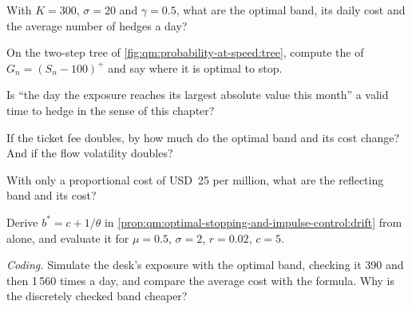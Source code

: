 \begin{exercise}[$\star$]\label{exo:qm:optimal-stopping-and-impulse-control:1}
With $K = 300$, $\sigma = 20$ and $\gamma = 0.5$, what are the optimal band, its daily cost and the average number of hedges a day?
\end{exercise}

\begin{exercise}[$\star$]\label{exo:qm:optimal-stopping-and-impulse-control:2}
On the two-step tree of \cref{fig:qm:probability-at-speed:tree}, compute the  of $G_n = (S_n - 100)^+$ and say where it
is optimal to stop.
\end{exercise}

\begin{exercise}[$\star$]\label{exo:qm:optimal-stopping-and-impulse-control:3}
Is ``the day the exposure reaches its largest absolute value this month'' a valid time to hedge in the sense of this chapter?
\end{exercise}

\begin{exercise}[$\star\star$]\label{exo:qm:optimal-stopping-and-impulse-control:4}
If the ticket fee doubles, by how much do the optimal band and its cost change? And if the flow volatility doubles?
\end{exercise}

\begin{exercise}[$\star\star$]\label{exo:qm:optimal-stopping-and-impulse-control:5}
With only a proportional cost of USD~25 per million, what are the reflecting band and its cost?
\end{exercise}

\begin{exercise}[$\star\star$]\label{exo:qm:optimal-stopping-and-impulse-control:6}
Derive $b^* = c + 1/\theta$ in \cref{prop:qm:optimal-stopping-and-impulse-control:drift} from  alone, and evaluate it for
$\mu = 0.5$, $\sigma = 2$, $r = 0.02$, $c = 5$.
\end{exercise}

\begin{exercise}[$\star\star\star$]\label{exo:qm:optimal-stopping-and-impulse-control:7}
\emph{Coding.} Simulate the desk's exposure with the optimal band, checking it 390 and then 1\,560 times a day, and compare the
average cost with the formula. Why is the discretely checked band cheaper?
\end{exercise}

